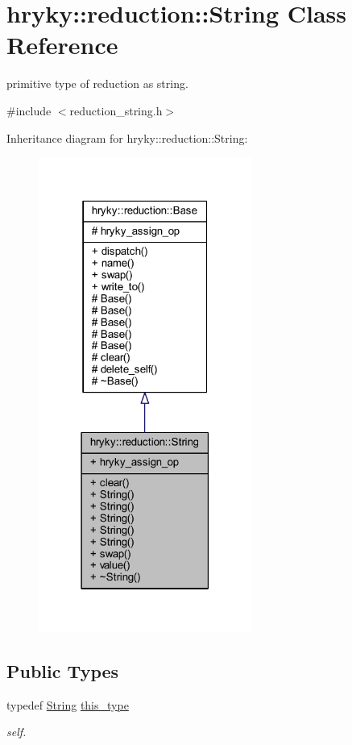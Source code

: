 \hypertarget{classhryky_1_1reduction_1_1_string}{\section{hryky\-:\-:reduction\-:\-:String Class Reference}
\label{classhryky_1_1reduction_1_1_string}
}


primitive type of reduction as string.  




{\ttfamily \#include $<$reduction\-\_\-string.\-h$>$}



Inheritance diagram for hryky\-:\-:reduction\-:\-:String\-:
\nopagebreak
\begin{figure}[H]
\begin{center}
\leavevmode
\includegraphics[width=198pt]{classhryky_1_1reduction_1_1_string__inherit__graph}
\end{center}
\end{figure}
\subsection*{Public Types}
\begin{DoxyCompactItemize}
\item 
\hypertarget{classhryky_1_1reduction_1_1_string_a29b0205072da7ad98f157a214080cc93}{typedef \hyperlink{classhryky_1_1reduction_1_1_string}{String} \hyperlink{classhryky_1_1reduction_1_1_string_a29b0205072da7ad98f157a214080cc93}{this\-\_\-type}}\label{classhryky_1_1reduction_1_1_string_a29b0205072da7ad98f157a214080cc93}

\begin{DoxyCompactList}\small\item\em self. \end{DoxyCompactList}\end{DoxyCompactItemize}
